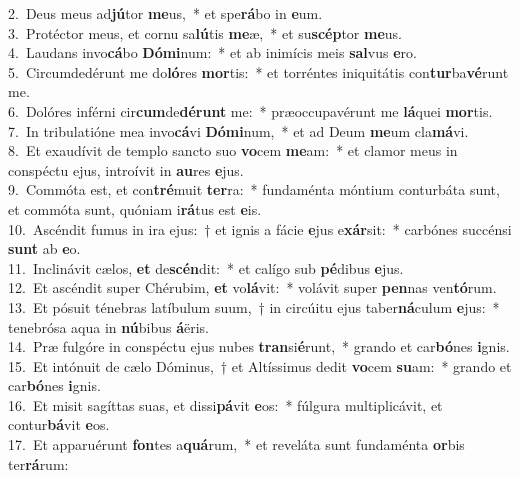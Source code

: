 {2.~}Deus meus ad\textbf{jú}tor \textbf{me}us,~* et spe\textbf{rá}bo in \textbf{e}um.\\
{3.~}Protéctor meus, et cornu sa\textbf{lú}tis \textbf{me}æ,~* et su\textbf{scép}tor \textbf{me}us.\\
{4.~}Laudans invo\textbf{cá}bo \textbf{Dó}\textbf{mi}num:~* et ab inimícis meis \textbf{sal}vus \textbf{e}ro.\\
{5.~}Circumdedérunt me do\textbf{ló}res \textbf{mor}tis:~* et torréntes iniquitátis con\textbf{tur}ba\textbf{vé}runt me.\\
{6.~}Dolóres inférni cir\textbf{cum}de\textbf{dé}\textbf{runt} me:~* præoccupavérunt me \textbf{lá}quei \textbf{mor}tis.\\
{7.~}In tribulatióne mea invo\textbf{cá}vi \textbf{Dó}\textbf{mi}num,~* et ad Deum \textbf{me}um cla\textbf{má}vi.\\
{8.~}Et exaudívit de templo sancto suo \textbf{vo}cem \textbf{me}am:~* et clamor meus in conspéctu ejus, introívit in \textbf{au}res \textbf{e}jus.\\
{9.~}Commóta est, et con\textbf{tré}muit \textbf{ter}ra:~* fundaménta móntium conturbáta sunt, et commóta sunt, quóniam i\textbf{rá}tus est \textbf{e}is.\\
{10.~}Ascéndit fumus in ira ejus:~† et ignis a fácie \textbf{e}jus e\textbf{xár}sit:~* carbónes succénsi \textbf{sunt} ab \textbf{e}o.\\
{11.~}Inclinávit cælos, \textbf{et} de\textbf{scén}dit:~* et calígo sub \textbf{pé}dibus \textbf{e}jus.\\
{12.~}Et ascéndit super Chérubim, \textbf{et} vo\textbf{lá}vit:~* volávit super \textbf{pen}nas ven\textbf{tó}rum.\\
{13.~}Et pósuit ténebras latíbulum suum,~† in circúitu ejus taber\textbf{ná}culum \textbf{e}jus:~* tenebrósa aqua in \textbf{nú}bibus \textbf{á}ëris.\\
{14.~}Præ fulgóre in conspéctu ejus nubes \textbf{tran}si\textbf{é}runt,~* grando et car\textbf{bó}nes \textbf{i}gnis.\\
{15.~}Et intónuit de cælo Dóminus,~† et Altíssimus dedit \textbf{vo}cem \textbf{su}am:~* grando et car\textbf{bó}nes \textbf{i}gnis.\\
{16.~}Et misit sagíttas suas, et dissi\textbf{pá}vit \textbf{e}os:~* fúlgura multiplicávit, et contur\textbf{bá}vit \textbf{e}os.\\
{17.~}Et apparuérunt \textbf{fon}tes a\textbf{quá}rum,~* et reveláta sunt fundaménta \textbf{or}bis ter\textbf{rá}rum:\\
